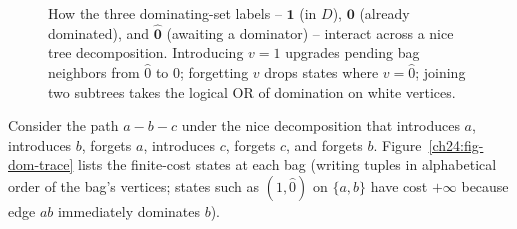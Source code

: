 \begin{figure}[htbp]
\caption{How the three dominating-set labels -- $\mathbf{1}$ (in $D$), $\mathbf{0}$ (already dominated), and $\hat{\mathbf{0}}$ (awaiting a dominator) -- interact across a nice tree decomposition. Introducing $v=1$ upgrades pending bag neighbors from $\hat{0}$ to $0$; forgetting $v$ drops states where $v=\hat{0}$; joining two subtrees takes the logical OR of domination on white vertices.}
\label{ch24:fig-dom-states}
\end{figure}

Consider the path $a-b-c$ under the nice decomposition that introduces $a$,
introduces $b$, forgets $a$, introduces $c$, forgets $c$, and forgets $b$.
Figure~\ref{ch24:fig-dom-trace} lists the finite-cost states at each bag (writing
tuples in alphabetical order of the bag's vertices; states such as $(1,\hat 0)$ on
$\{a,b\}$ have cost $+\infty$ because edge $ab$ immediately dominates $b$).

